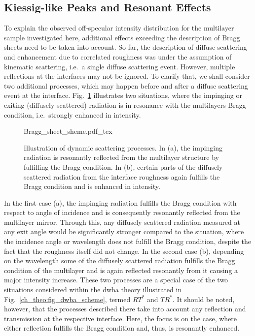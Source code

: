 \subsection{Kiessig-like Peaks and Resonant Effects}
To explain the observed off-specular intensity distribution for the multilayer sample investigated here, additional effects exceeding the description of Bragg sheets need to be taken into account. So far, the description of diffuse scattering and enhancement due to correlated roughness was under the assumption of kinematic scattering, i.e.~a single diffuse scattering event. However, multiple reflections at the interfaces may not be ignored. To clarify that, we shall consider two additional processes, which may happen before and after a diffuse scattering event at the interface. Fig.~\ref{ch_diff:fig_kiessig_like_peaks_scheme} illustrates two situations, where the impinging or exiting (diffusely scattered) radiation is in resonance with the multilayers Bragg condition, i.e.~strongly enhanced in intensity.
\begin{figure}[htb]
    {Bragg_sheet_sheme.pdf_tex}
    \caption[Illustration of dynamic scattering processes]{Illustration of dynamic scattering processes. In (a), the impinging radiation is resonantly reflected from the multilayer structure by fulfilling the Bragg condition. In (b), certain parts of the diffusely scattered radiation from the interface roughness again fulfills the Bragg condition and is enhanced in intensity.}
    \label{ch_diff:fig_kiessig_like_peaks_scheme}
\end{figure}
In the first case (a), the impinging radiation fulfills the Bragg condition with respect to angle of incidence and is consequently resonantly reflected from the multilayer mirror. Through this, any diffusely scattered radiation measured at any exit angle would be significantly stronger compared to the situation, where the incidence angle or wavelength does not fulfill the Bragg condition, despite the fact that the roughness itself did not change. In the second case (b), depending on the wavelength some of the diffusely scattered radiation fulfills the Bragg condition of the multilayer and is again reflected resonantly from it causing a major intensity increase. These two processes are a special case of the two situations considered within the \gls{dwba} theory illustrated in Fig.~\ref{ch_theo:fig_dwba_scheme}, termed $R T^*$ and $T R^*$. It should be noted, however, that the processes described there take into account any reflection and transmission at the respective interface. Here, the focus is on the case, where either reflection fulfills the Bragg condition and, thus, is resonantly enhanced.

